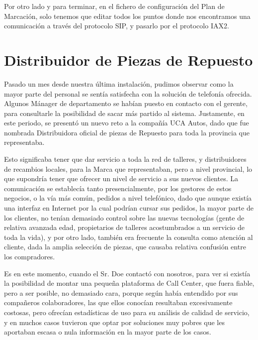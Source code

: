 

Por otro lado y para terminar, en el fichero de configuración del Plan de Marcación, solo tenemos que editar todos los puntos donde nos encontramos una comunicación a través del protocolo SIP, y pasarlo por el protocolo IAX2. 

\newpage

\color[rgb]{0,0,1}

\section{Distribuidor de Piezas de Repuesto}

Pasado un mes desde nuestra última instalación, pudimos observar como la mayor parte del personal se sentía satisfecha con la solución de telefonía ofrecida. Algunos Mánager de departamento se habían puesto en contacto con el gerente, para consultarle la posibilidad de sacar más partido al sistema. Justamente, en este periodo, se presentó un nuevo reto a la compañía UCA Autos, dado que fue nombrada Distribuidora oficial de piezas de Repuesto para toda la provincia que representaba.

Esto significaba tener que dar servicio a toda la red de talleres, y distribuidores de recambios locales, para la Marca que representaban, pero a nivel provincial, lo que supondría tener que ofrecer un nivel de servicio a sus nuevos clientes. La comunicación se establecía tanto presencialmente, por los gestores de estos negocios, o la vía más común, pedidos a nivel telefónico, dado que aunque existía una interfaz en Internet por la cual podrían cursar sus pedidos, la mayor parte de los clientes, no tenían demasiado control sobre las nuevas tecnologías (gente de relativa avanzada edad, propietarios de talleres acostumbrados a un servicio de toda la vida), y por otro lado, también era frecuente la consulta como atención al cliente, dada la amplia selección de piezas, que causaba relativa confusión entre los compradores.

Es en este momento, cuando el Sr. Doe contactó con nosotros, para ver si existía la posibilidad de montar una pequeña plataforma de Call Center, que fuera fiable, pero a ser posible, no demasiado cara, porque según había entendido por sus compañeros colaboradores, las que ellos conocían resultaban excesivamente costosas, pero ofrecían estadísticas de uso para su análisis de calidad de servicio, y en muchos casos tuvieron que optar por soluciones muy pobres que les aportaban escasa o nula información en la mayor parte de los casos.

